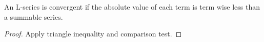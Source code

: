 \begin{theorem}
\label{LSeriesSummable_two_pow_omega}
\leanok
An L-series is convergent if the absolute value of each term is term wise less than a summable series.
\end{theorem}
\begin{proof}
\leanok
Apply triangle inequality and comparison test.
\end{proof}
